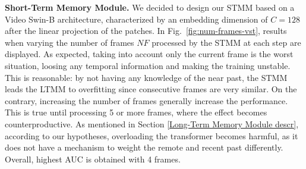 \noindent\textbf{Short-Term Memory Module.}
\label{Short-Term Memory Module exp}
We decided to design our STMM based on a Video Swin-B architecture, characterized by an embedding dimension of $C = 128$ after the linear projection of the patches. %
In Fig.~\ref{fig:num-frames-vst}, results when varying the number of frames $\mathit{NF}$ processed by the STMM at each step are displayed.
As expected, taking into account only the current frame is the worst situation, loosing any temporal information and making the training unstable.
This is reasonable: by not having any knowledge of the near past, the STMM leads the LTMM to overfitting since consecutive frames are very similar.
On the contrary, increasing the number of frames generally increase the performance. 
This is true until processing 5 or more frames, where the effect becomes counterproductive.
As mentioned in Section \ref{Long-Term Memory Module descr}, according to our hypotheses, overloading the transformer becomes harmful, as it does not have a mechanism to weight the remote and recent past differently.
Overall, highest AUC is obtained with 4 frames.

